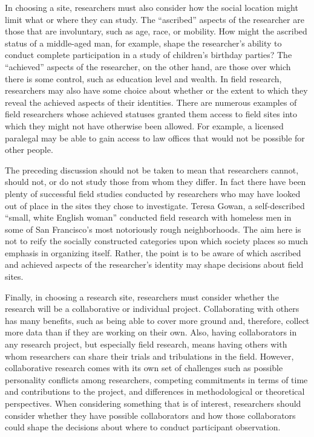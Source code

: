 In choosing a site, researchers must also consider how the social location might limit what or where they can study. The ``ascribed'' aspects of the researcher are those that are involuntary, such as age, race, or mobility. How might the ascribed status of a middle-aged man, for example, shape the researcher's ability to conduct complete participation in a study of children's birthday parties? The ``achieved'' aspects of the researcher, on the other hand, are those over which there is some control, such as education level and wealth. In field research, researchers may also have some choice about whether or the extent to which they reveal the achieved aspects of their identities. There are numerous examples of field researchers whose achieved statuses granted them access to field sites into which they might not have otherwise been allowed. For example, a licensed paralegal may be able to gain access to law offices that would not be possible for other people.

The preceding discussion should not be taken to mean that researchers cannot, should not, or do not study those from whom they differ. In fact there have been plenty of successful field studies conducted by researchers who may have looked out of place in the sites they chose to investigate. Teresa Gowan, a self-described ``small, white English woman'' conducted field research with homeless men in some of San Francisco's most notoriously rough neighborhoods\cite{gowan2010hobos}. The aim here is not to reify the socially constructed categories upon which society places so much emphasis in organizing itself. Rather, the point is to be aware of which ascribed and achieved aspects of the researcher's identity may shape decisions about field sites.

Finally, in choosing a research site, researchers must consider whether the research will be a collaborative or individual project. Collaborating with others has many benefits, such as being able to cover more ground and, therefore, collect more data than if they are working on their own. Also, having collaborators in any research project, but especially field research, means having others with whom researchers can share their trials and tribulations in the field. However, collaborative research comes with its own set of challenges such as possible personality conflicts among researchers, competing commitments in terms of time and contributions to the project, and differences in methodological or theoretical perspectives. When considering something that is of interest, researchers should consider whether they have possible collaborators and how those collaborators could shape the decisions about where to conduct participant observation.

